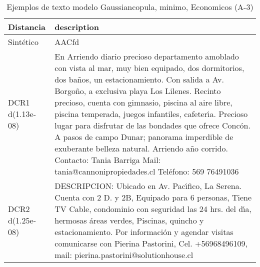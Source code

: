 \begin{table}[H]
\centering
\fontsize{10}{14}\selectfont
\caption{Ejemplos de texto modelo Gaussiancopula, minimo, Economicos (A-3)}
\label{table-example-economicos-a-3-gaussiancopula-min-text}
\begin{tabular}{|l|m{35em}|}
\hline
\rowcolor[gray]{0.8}
Distancia & description \\
\hline Sintético & AACfd \\
\hline DCR1 d(1.13e-08) & En Arriendo diario precioso departamento amoblado con vista al mar, muy bien equipado, dos dormitorios, dos ba\~nos, un estacionamiento. Con salida a Av. Borgo\~no, a exclusiva playa Los Lilenes. Recinto precioso, cuenta con gimnasio, piscina al aire libre, piscina temperada, juegos infantiles, cafeter{\'\i}a. Precioso lugar para disfrutar de las bondades que ofrece Conc\'on. A pasos de campo Dunar; panorama imperdible de exuberante belleza natural. Arriendo a\~no corrido.  Contacto: Tania Barriga Mail: tania@cannonipropiedades.cl Tel\'efono: 569 76491036 \\
\hline DCR2 d(1.25e-08) & DESCRIPCION: Ubicado en Av. Pac{\'\i}fico, La Serena. Cuenta con 2 D. y 2B, Equipado para 6 personas, Tiene TV Cable, condominio con seguridad las 24 hrs. del d{\'\i}a, hermosas \'areas verdes, Piscinas, quincho y estacionamiento.  Por informaci\'on y agendar visitas comunicarse con Pierina Pastorini, Cel. +56968496109, mail: pierina.pastorini@solutionhouse.cl \\
\hline
\end{tabular}
\end{table}
